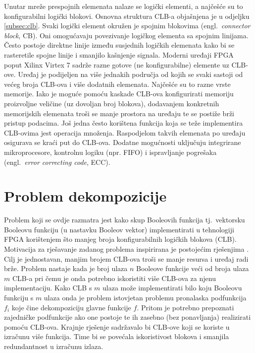 \documentclass[times, utf8, diplomski]{fer}
\begin{document}
Unutar mreže prespojnih elemenata nalaze se logički elementi, a najčešće su to konfigurabilni logički blokovi. Osnovna struktura CLB-a objašnjena je u odjeljku \ref{subsec:clb}. Svaki logički element okružen je spojnim blokovima (engl.~\textit{connector block}, CB). Oni omogućavaju povezivanje logičkog elementa sa spojnim linijama. Često postoje direktne linije između susjednih logičkih elemenata kako bi se rasteretile spojne linije i smanjilo kašnjenje signala. Moderni uređaji FPGA poput Xilinx Virtex 7 sadrže razne gotove (ne konfigurabilne) elemente uz CLB-ove. Uređaj je podijeljen na više jednakih područja od kojih se svaki sastoji od većeg broja CLB-ova i više dodatnih elemenata. Najčešće su to razne vrste memorije. Iako je moguće pomoću kaskade CLB-ova konfigurirati memoriju proizvoljne veličine (uz dovoljan broj blokova), dodavanjem konkretnih memorijskih elemenata troši se manje prostora na uređaju te se postiže brži pristup podacima. Još jedna često korištena funkcija koja se teže implementira CLB-ovima jest operacija množenja. Raspodjelom takvih elemenata po uređaju osigurava se kraći put do CLB-ova. Dodatne mogućnosti uključuju integrirane mikroprocesore, kontrolnu logiku (npr. FIFO) i ispravljanje pogrešaka (engl.~\textit{error correcting code}, ECC).


\section{Problem dekompozicije} \label{sec:decomposition}

Problem koji se ovdje razmatra jest kako skup Booleovih funkcija tj.~vektorsku Booleovu funkciju (u nastavku Booleov vektor) implementirati u tehnologiji FPGA korištenjem što manjeg broja konfigurabilnih logičkih blokova (CLB). Motivacija za rješavanje zadanog problema inspirirana je postojećim rješenjima \cite{article:related}. Cilj je jednostavan, manjim brojem CLB-ova troši se manje resursa i uređaj radi brže. Problem nastaje kada je broj ulaza $n$ Booleove funkcije veći od broja ulaza $m$ CLB-a pri čemu je onda potrebno iskoristiti više CLB-ova za njenu implementaciju. Kako CLB s $m$ ulaza može implementirati bilo koju Booleovu funkciju s $m$ ulaza onda je problem istovjetan problemu pronalaska podfunkcija $f_{i}$ koje čine dekompoziciju glavne funkcije $f$. Pritom je potrebno prepoznati zajedničke podfunkcije ako one postoje te ih zasebno (bez ponavljanja) realizirati pomoću CLB-ova. Krajnje rješenje sadržavalo bi CLB-ove koji se koriste u izračunu više funkcija. Time bi se povećala iskoristivost blokova i smanjila redundantnost u izračunu izlaza.
\end{document}
